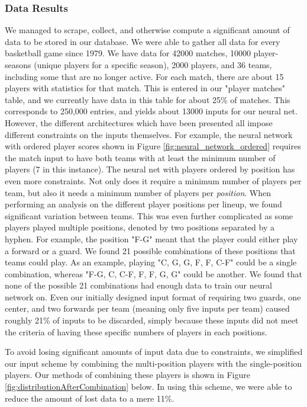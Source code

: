 \subsubsection{Data Results}
We managed to scrape, collect, and otherwise compute a significant amount of data to be stored in our database. We were able to gather all data for every basketball game since 1979. We have data for 42000 matches, 10000 player-seasons (unique players for a specific season), 2000 players, and 36 teams, including some that are no longer active. For each match, there are about 15 players with statistics for that match. This is entered in our "player matches" table, and we currently have data in this table for about 25\% of matches. This corresponds to 250,000 entries, and yields about 13000 inputs for our neural net. However, the different architectures which have been presented all impose different constraints on the inputs themselves. For example, the neural network with ordered player scores shown in Figure \ref{fig:neural_network_ordered} requires the match input to have both teams with at least the minimum number of  players (7 in this instance). The neural net with players ordered by position has even more constraints. Not only does it require a minimum number of players per team, but also it needs a minimum number of players per \textit{position}. When performing an analysis on the different player positions per lineup, we found significant variation between teams. This was even further complicated as some players played multiple positions, denoted by two positions separated by a hyphen. For example, the position "F-G" meant that the player could either play a forward or a guard. We found 21 possible combinations of these positions that teams could play. As an example, playing "C, G, G, F, F, C-F" could be a single combination, whereas "F-G, C, C-F, F, F, G, G" could be another. We found that none of the possible 21 combinations had enough data to train our neural network on. Even our initially designed input format of requiring two guards, one center, and two forwards per team (meaning only five inputs per team) caused roughly 21\% of inputs to be discarded, simply because these inputs did not meet the criteria of having these specific numbers of players in each positions.

To avoid losing significant amounts of input data due to constraints, we simplified our input scheme by combining the multi-position players with the single-position players. Our methods of combining these players is shown in Figure \ref{fig:distributionAfterCombination} below. In using this scheme, we were able to reduce the amount of lost data to a mere 11\%.

